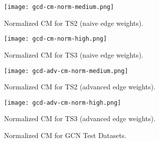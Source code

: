 \begin{figure}[htb]
  \centering
  \begin{minipage}{0.49\textwidth}
    \centering
    \texttt{[image: gcd-cm-norm-medium.png]}
    \caption{Normalized CM for TS2 (naive edge weights).}
  \end{minipage}
  \begin{minipage}{0.49\textwidth}
    \centering
    \texttt{[image: gcd-cm-norm-high.png]}
    \caption{Normalized CM for TS3 (naive edge weights).}
  \end{minipage}
  \begin{minipage}{0.49\textwidth}
    \centering
    \texttt{[image: gcd-adv-cm-norm-medium.png]}
    \caption{Normalized CM for TS2 (advanced edge weights).}
  \end{minipage}
  \begin{minipage}{0.49\textwidth}
    \centering
    \texttt{[image: gcd-adv-cm-norm-high.png]}
    \caption{Normalized CM for TS3 (advanced edge weights).}
  \end{minipage}  
  \caption{Normalized CM for GCN Test Datasets.}
  \label{fig:gcn-cm-norm}
\end{figure}
